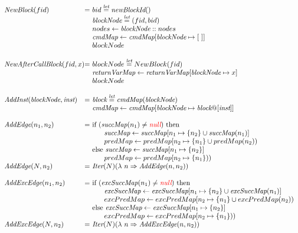 \[
\begin{array}{l@{}l@{~}l}
\emph{NewBlock}(fid)
	& = & bid \letval \emph{newBlockId}()\\
	& & \emph{blockNode} \letval (fid,bid)\\
	& & nodes \leftarrow \emph{blockNode}::nodes\\
	& & \emph{cmdMap} \leftarrow \emph{cmdMap}[\emph{blockNode} \mapsto [\ ]]\\
   & & blockNode \\
	& & \\

\emph{NewAfterCallBlock}(fid,x)
	& = & blockNode \letval NewBlock(fid) \\
	& & \emph{returnVarMap} \leftarrow \emph{returnVarMap}[\emph{blockNode} \mapsto x] \\
   & & blockNode \\
	& & \\

\emph{AddInst}(\emph{blockNode}, \emph{inst})
	& = & \emph{block} \letval \emph{cmdMap}(\emph{blockNode})\\
	& & \emph{cmdMap} \leftarrow \emph{cmdMap}[\emph{blockNode} \mapsto \emph{block}@[\emph{inst}]]\\
	& & \\

\emph{AddEdge}(n_1,n_2)
	& = & \mbox{if}\ (\emph{succMap}(n_1) \neq \nullK)\ \mbox{then}\\
	& & \phantom{else} \emph{succMap} \leftarrow \emph{succMap}[n_1 \mapsto \{n_2\}\cup \emph{succMap}(n_1)]\\
	& & \phantom{else} predMap \leftarrow predMap[n_2 \mapsto \{n_1\}\cup predMap(n_2))\\
	& & \mbox{else}\ \emph{succMap} \leftarrow \emph{succMap}[n_1 \mapsto \{n_2\}]\\
	& & \phantom{else} predMap \leftarrow predMap[n_2 \mapsto \{n_1\}))\\
\emph{AddEdge}(N,n_2)
	& = & \Iter(N)(\lambda\ n\Rightarrow \emph{AddEdge}(n,n_2)) \\
	& & \\

\emph{AddExcEdge}(n_1,n_2)
	& = & \mbox{if}\ (\emph{excSuccMap}(n_1) \neq \nullK)\ \mbox{then}\\
	& & \phantom{else} \emph{excSuccMap} \leftarrow \emph{excSuccMap}[n_1 \mapsto \{n_2\}\cup \emph{excSuccMap}(n_1)]\\
	& & \phantom{else} excPredMap \leftarrow excPredMap[n_2 \mapsto \{n_1\}\cup excPredMap(n_2))\\
	& & \mbox{else}\ \emph{excSuccMap} \leftarrow \emph{excSuccMap}[n_1 \mapsto \{n_2\}]\\
	& & \phantom{else} excPredMap \leftarrow excPredMap[n_2 \mapsto \{n_1\}))\\
\emph{AddExcEdge}(N,n_2)
	& = & \Iter(N)(\lambda\ n\Rightarrow \emph{AddExcEdge}(n,n_2)) \\
	& & \\
	

\end{array}\]
